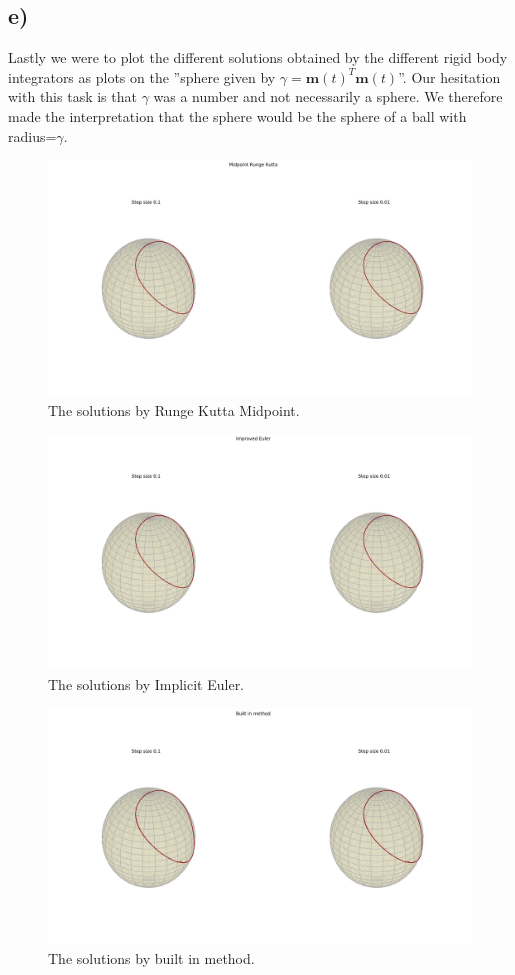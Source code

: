 \documentclass[12pt, a4paper,usenames,dvipsnames]{article}
\renewcommand\vec{\mathbf}
\begin{document}
\subsection*{e)}
Lastly we were to plot the different solutions obtained by the different rigid body integrators as plots on the ''sphere given by $\gamma = \vec{m}(t)^T \vec{m}(t)$''. Our hesitation with this task is that $\gamma$ was a number and not necessarily a sphere. We therefore made the interpretation that the sphere would be the sphere of a ball with radius=$\gamma$.
\pagestyle{plain}
\begin{figure}
    \centering
    \includegraphics[width=\linewidth]{SphRKMid.png}
    \caption{The solutions by Runge Kutta Midpoint.}
    \label{fig:SphRKMid}
\end{figure}
\begin{figure}
    \centering
    \includegraphics[width=\linewidth]{SphIMPEul.png}
    \caption{The solutions by Implicit Euler.}
    \label{fig:SphImpEul}
\end{figure}
\begin{figure}
    \centering
    \includegraphics[width=\linewidth]{SphBTin.png}
    \caption{The solutions by built in method.}
    \label{fig:SphBTin}
\end{figure}
\end{document}
